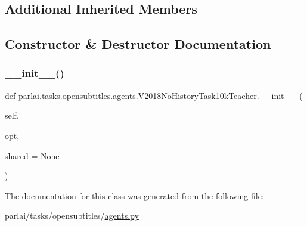 \subsection*{Additional Inherited Members}


\subsection{Constructor \& Destructor Documentation}
\mbox{\label{classparlai_1_1tasks_1_1opensubtitles_1_1agents_1_1V2018NoHistoryTask10kTeacher_ace3fc69c7a84c37416b3b50b86735169}} 
\subsubsection{\texorpdfstring{\+\_\+\+\_\+init\+\_\+\+\_\+()}{\_\_init\_\_()}}
{\footnotesize\ttfamily def parlai.\+tasks.\+opensubtitles.\+agents.\+V2018\+No\+History\+Task10k\+Teacher.\+\_\+\+\_\+init\+\_\+\+\_\+ (\begin{DoxyParamCaption}\item[{}]{self,  }\item[{}]{opt,  }\item[{}]{shared = {\ttfamily None} }\end{DoxyParamCaption})}



The documentation for this class was generated from the following file\+:\begin{DoxyCompactItemize}
\item 
parlai/tasks/opensubtitles/\hyperlink{parlai_2tasks_2opensubtitles_2agents_8py}{agents.\+py}\end{DoxyCompactItemize}
